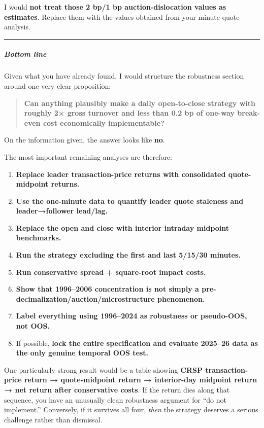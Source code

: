 I would \textbf{not treat those 2 bp/1 bp auction-dislocation values as estimates}. Replace them with the values obtained from your minute-quote analysis.

\begin{center}\rule{0.5\linewidth}{0.5pt}\end{center}

\hypertarget{bottom-line}{%
\subparagraph{Bottom line}\label{bottom-line}}

Given what you have already found, I would structure the robustness section around one very clear proposition:

\begin{quote}
\textbf{Can anything plausibly make a daily open-to-close strategy with roughly 2× gross turnover and less than 0.2 bp of one-way break-even cost economically implementable?}
\end{quote}

On the information given, the answer looks like \textbf{no}.

The most important remaining analyses are therefore:

\begin{enumerate}
\def\labelenumi{\arabic{enumi}.}
\tightlist
\item
  \textbf{Replace leader transaction-price returns with consolidated quote-midpoint returns.}
\item
  \textbf{Use the one-minute data to quantify leader quote staleness and leader→follower lead/lag.}
\item
  \textbf{Replace the open and close with interior intraday midpoint benchmarks.}
\item
  \textbf{Run the strategy excluding the first and last 5/15/30 minutes.}
\item
  \textbf{Run conservative spread + square-root impact costs.}
\item
  \textbf{Show that 1996--2006 concentration is not simply a pre-decimalization/auction/microstructure phenomenon.}
\item
  \textbf{Label everything using 1996--2024 as robustness or pseudo-OOS, not OOS.}
\item
  If possible, \textbf{lock the entire specification and evaluate 2025--26 data as the only genuine temporal OOS test.}
\end{enumerate}

One particularly strong result would be a table showing \textbf{CRSP transaction-price return → quote-midpoint return → interior-day midpoint return → net return after conservative costs}. If the return dies along that sequence, you have an unusually clean robustness argument for ``do not implement.'' Conversely, if it survives all four, \emph{then} the strategy deserves a serious challenge rather than dismissal.
